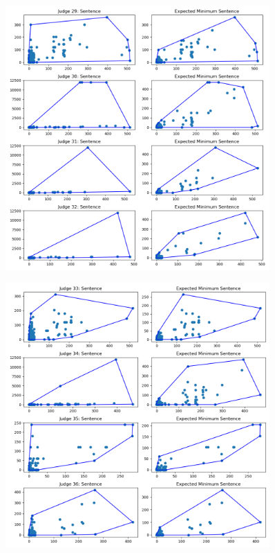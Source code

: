 \documentclass[11pt]{article}
\begin{document}
  \begin{figure}[H]
    \centering
    \includegraphics[width=0.9\textwidth]{../../../output/figures/Exploration/judge_convex_hulls_7.png}
  \end{figure}

  \begin{figure}[H]
    \centering
    \includegraphics[width=0.9\textwidth]{../../../output/figures/Exploration/judge_convex_hulls_8.png}
  \end{figure}
\end{document}
